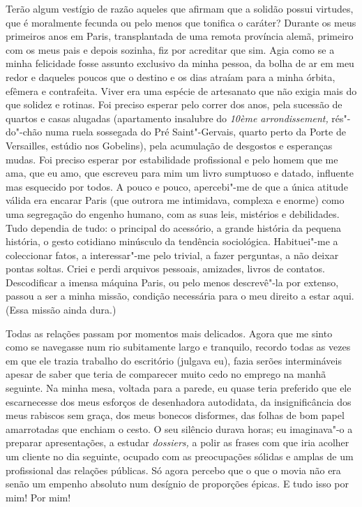 Terão algum vestígio de razão aqueles que afirmam que a solidão possui
virtudes, que é moralmente fecunda ou pelo menos que tonifica o
caráter? Durante os meus primeiros anos em Paris, transplantada de uma
remota província alemã, primeiro com os meus pais e depois sozinha, fiz
por acreditar que sim. Agia como se a minha felicidade fosse assunto
exclusivo da minha pessoa, da bolha de ar em meu redor e daqueles
poucos que o destino e os dias atraíam para a minha órbita, efêmera e
contrafeita. Viver era uma espécie de artesanato que não exigia mais do
que solidez e rotinas. Foi preciso esperar pelo correr dos anos, pela
sucessão de quartos e casas alugadas (apartamento insalubre do
\emph{10ème arrondissement, }rés"-do"-chão
numa ruela sossegada do Pré Saint"-Gervais, quarto perto da Porte de
Versailles, estúdio nos Gobelins), pela acumulação de desgostos e
esperanças mudas. Foi preciso esperar por estabilidade profissional e
pelo homem que me ama, que eu amo, que escreveu para mim um livro
sumptuoso e datado, influente mas esquecido por todos. A pouco e pouco,
apercebi"-me de que a única atitude válida era encarar Paris (que outrora me
intimidava, complexa e enorme) como uma segregação do engenho humano,
com as suas leis, mistérios e debilidades. Tudo dependia de tudo: o
principal do acessório, a grande história da pequena história, o gesto
cotidiano minúsculo da tendência sociológica. Habituei"-me a coleccionar
fatos, a interessar"-me pelo trivial, a fazer perguntas, a não deixar
pontas soltas. Criei e perdi arquivos pessoais, amizades, livros de
contatos. Descodificar a imensa máquina Paris, ou pelo menos
descrevê"-la por extenso, passou a ser a minha missão, condição
necessária para o meu direito a estar aqui. (Essa missão ainda dura.)

Todas as relações passam por momentos mais delicados. Agora que me sinto
como se navegasse num rio subitamente largo e tranquilo, recordo todas
as vezes em que ele trazia trabalho do escritório (julgava eu), fazia
serões intermináveis apesar de saber que teria de comparecer muito cedo
no emprego na manhã seguinte. Na minha mesa, voltada para a parede, eu
quase teria preferido que ele escarnecesse dos meus esforços de
desenhadora autodidata, da insignificância dos meus rabiscos sem graça,
dos meus bonecos disformes, das folhas de bom papel amarrotadas que
enchiam o cesto. O seu silêncio durava horas; eu imaginava"-o a
preparar apresentações, a estudar \emph{dossiers, }a polir as frases com
que iria acolher um cliente no dia seguinte, ocupado com as preocupações
sólidas e amplas
de um profissional das relações públicas. Só agora percebo que o que o
movia não era senão um empenho absoluto num desígnio de proporções
épicas. E tudo isso por mim! Por mim!

